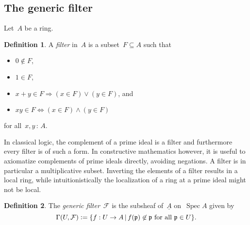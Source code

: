 \documentclass[10pt]{amsart}
\theoremstyle{definition}
\newtheorem{defn}{Definition}[section]
\theoremstyle{plain}
\theoremstyle{remark}
\newcommand{\F}{\mathcal{F}}
\newcommand{\ppp}{\mathfrak{p}}
\newcommand{\ul}[1]{\underline{#1}}
\DeclareMathOperator{\Spec}{Spec}
\newcommand{\?}{\,{:}\,}
\renewcommand{\_}{\mathpunct{.}\,}
\newcommand{\defeq}{\vcentcolon=}
\begin{document}
\subsection{The generic filter}

Let~$A$ be a ring.

\begin{defn}A \emph{filter} in~$A$ is a subset~$F \subseteq A$ such that
\begin{itemize}
\item $0 \not\in F$,
\item $1 \in F$,
\item $x + y \in F \Longrightarrow (x \in F) \vee (y \in F)$, and
\item $xy \in F \Longleftrightarrow (x \in F) \wedge (y \in F)$
\end{itemize}
for all~$x,y \? A$.
\end{defn}

In classical logic, the complement of a prime ideal is a filter and
furthermore every filter is of such a form. In constructive mathematics however,
it is useful to axiomatize complements of prime ideals directly, avoiding
negations. A filter is in particular a multiplicative subset. Inverting the
elements of a filter results in a local ring, while intuitionistically
the localization of a ring at a prime ideal might not be local.

\begin{defn}The \emph{generic filter}~$\F$ is the subsheaf of~$\ul{A}$
on~$\Spec A$ given by
\[ \Gamma(U, \F) \defeq \{ f : U \to A \,|\,
  \text{$f(\ppp) \not\in \ppp$ for all $\ppp \in U$} \}. \]
\end{defn}
\end{document}
